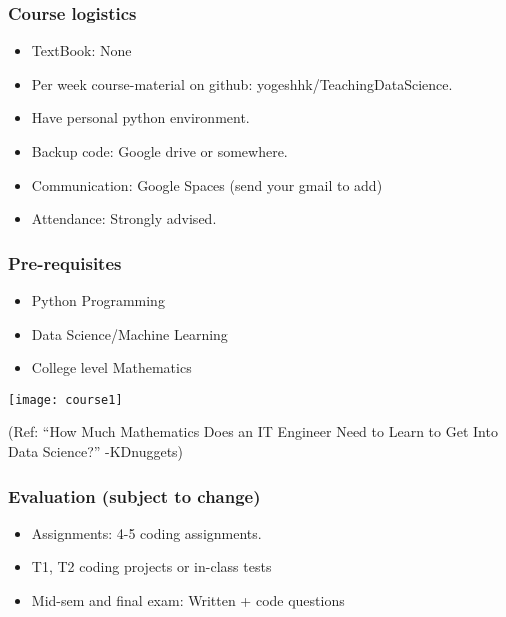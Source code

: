 
\begin{frame}[fragile]\frametitle{Course logistics}
\begin{itemize}
\item TextBook: None
\item Per week course-material on github: yogeshhk/TeachingDataScience.
\item Have personal python environment.
\item Backup code: Google drive or somewhere.
\item Communication: Google Spaces (send your gmail to add)
\item Attendance: Strongly advised.
\end{itemize}
\end{frame}


\begin{frame}[fragile]\frametitle{Pre-requisites}
\begin{itemize}
\item Python Programming
\item Data Science/Machine Learning
\item College level Mathematics
\end{itemize}
\begin{center}
\texttt{[image: course1]}
\end{center}
{\tiny (Ref: ``How Much Mathematics Does an IT Engineer Need to Learn to Get Into Data Science?'' -KDnuggets)}
\end{frame}

\begin{frame}[fragile]\frametitle{Evaluation (subject to change)}
\begin{itemize}
\item Assignments: 4-5 coding assignments. 
\item T1, T2 coding projects or in-class tests
\item Mid-sem and final exam: Written + code questions
\end{itemize}
\end{frame}

